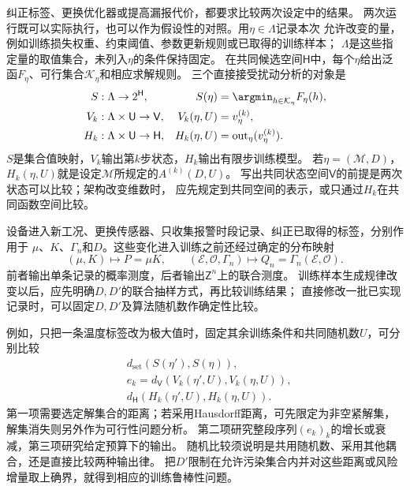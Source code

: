 纠正标签、更换优化器或提高漏报代价，都要求比较两次设定中的结果。
两次运行既可以实际执行，也可以作为假设性的对照。用$\eta\in\Lambda$记录本次
允许改变的量，例如训练损失权重、约束阈值、参数更新规则或已取得的训练样本；
$\Lambda$是这些指定量的取值集合，未列入$\eta$的条件保持固定。
在共同候选空间$\mathsf H$中，每个$\eta$给出泛函$F_\eta$、可行集合$\mathcal K_\eta$和相应求解规则。
三个直接接受扰动分析的对象是
\begin{equation}
  \begin{aligned}
    S&:\Lambda\to2^{\mathsf H},
      &S(\eta)&=\argmin_{h\in\mathcal K_\eta}F_\eta(h),\\
    V_k&:\Lambda\times\mathsf U\to\mathsf V,
      &V_k(\eta,U)&=v_\eta^{(k)},\\
    H_k&:\Lambda\times\mathsf U\to\mathsf H,
      &H_k(\eta,U)&=\operatorname{out}_\eta(v_\eta^{(k)}).
  \end{aligned}
  \label{eq:future-task-configuration-response-maps}
\end{equation}
$S$是集合值映射，$V_k$输出第$k$步状态，$H_k$输出有限步训练模型。
若$\eta=(\mathcal M,D)$，$H_k(\eta,U)$就是设定$\mathcal M$所规定的$A^{(k)}(D,U)$。
写出共同状态空间$\mathsf V$的前提是两次状态可以比较；架构改变维数时，
应先规定到共同空间的表示，或只通过$H_k$在共同函数空间比较。

设备进入新工况、更换传感器、只收集报警时段记录、纠正已取得的标签，分别作用于
$\mu$、$K$、$\Gamma_n$和$D$。这些变化进入训练之前还经过确定的分布映射
\[
  (\mu,K)\mapsto P=\mu K,\qquad
  (\mathcal E,\mathcal O,\Gamma_n)\mapsto
       Q_n=\Gamma_n(\mathcal E,\mathcal O).
\]
前者输出单条记录的概率测度，后者输出$\mathsf Z^n$上的联合测度。
训练样本生成规律改变以后，应先明确$D,D'$的联合抽样方式，再比较训练结果；
直接修改一批已实现记录时，可以固定$D,D'$及算法随机数作确定性比较。


例如，只把一条温度标签改为极大值时，固定其余训练条件和共同随机数$U$，可分别比较
\[
  \begin{aligned}
    &d_{\mathrm{set}}(S(\eta'),S(\eta)),\\
    &e_k=d_{\mathsf V}(V_k(\eta',U),V_k(\eta,U)),\\
    &d_{\mathsf H}(H_k(\eta',U),H_k(\eta,U)).
  \end{aligned}
\]
第一项需要选定解集合的距离；若采用Hausdorff距离，可先限定为非空紧解集，
解集消失则另外作为可行性问题分析。
第二项研究整段序列$(e_k)_k$的增长或衰减，第三项研究给定预算下的输出。
随机比较须说明是共用随机数、采用其他耦合，还是直接比较两种输出律。
把$D'$限制在允许污染集合内并对这些距离或风险增量取上确界，就得到相应的训练鲁棒性问题。

